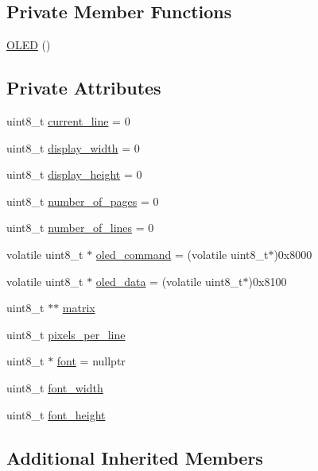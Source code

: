 \subsection*{Private Member Functions}
\begin{DoxyCompactItemize}
\item 
\hyperlink{class_o_l_e_d_a8eabf371b5642d99800adb759dab27fd}{O\+L\+ED} ()
\end{DoxyCompactItemize}
\subsection*{Private Attributes}
\begin{DoxyCompactItemize}
\item 
uint8\+\_\+t \hyperlink{class_o_l_e_d_aebd62601be5e2ceef6295721f17fc013}{current\+\_\+line} = 0
\item 
uint8\+\_\+t \hyperlink{class_o_l_e_d_a2e9305cb3341509bb62d61f33cae76fd}{display\+\_\+width} = 0
\item 
uint8\+\_\+t \hyperlink{class_o_l_e_d_add08b51dec0ffeebcba7902c3bd4aeea}{display\+\_\+height} = 0
\item 
uint8\+\_\+t \hyperlink{class_o_l_e_d_aaac99b0eb4e9dfe92b8571488dc89288}{number\+\_\+of\+\_\+pages} = 0
\item 
uint8\+\_\+t \hyperlink{class_o_l_e_d_a9ea1c55112deede1a61142af276a6bc9}{number\+\_\+of\+\_\+lines} = 0
\item 
volatile uint8\+\_\+t $\ast$ \hyperlink{class_o_l_e_d_af0a85ccd0274347b8c1ac77d298a14cf}{oled\+\_\+command} = (volatile uint8\+\_\+t$\ast$)0x8000
\item 
volatile uint8\+\_\+t $\ast$ \hyperlink{class_o_l_e_d_a1bc54d49808f92ddfc354511b692df6f}{oled\+\_\+data} = (volatile uint8\+\_\+t$\ast$)0x8100
\item 
uint8\+\_\+t $\ast$$\ast$ \hyperlink{class_o_l_e_d_a9d32e21189940afba24deab0a2bc0126}{matrix}
\item 
uint8\+\_\+t \hyperlink{class_o_l_e_d_a6ddac7b826eccac8c682c5246ef52b29}{pixels\+\_\+per\+\_\+line}
\item 
uint8\+\_\+t $\ast$ \hyperlink{class_o_l_e_d_a29ab86a4a73f4d343bf1810927f0911d}{font} = nullptr
\item 
uint8\+\_\+t \hyperlink{class_o_l_e_d_a3c9ea103adf6c860a2534135e9a25ba8}{font\+\_\+width}
\item 
uint8\+\_\+t \hyperlink{class_o_l_e_d_a85b91421932866dea031921799ba83a3}{font\+\_\+height}
\end{DoxyCompactItemize}
\subsection*{Additional Inherited Members}


